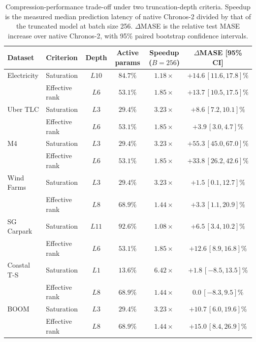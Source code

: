 \begin{table}[t]
    \centering
    \small
    \setlength{\tabcolsep}{4pt}
    \caption{
    Compression-performance trade-off under two truncation-depth criteria.
    Speedup is the measured median prediction latency of native Chronos-2
    divided by that of the truncated model at batch size 256.
    \(\Delta\)MASE is the relative test MASE increase over native Chronos-2,
    with 95\% paired bootstrap confidence intervals.
    }
    \label{tab:compression-selection}
    \begin{tabular}{llcccc}
        \toprule
        Dataset & Criterion & Depth & Active params & Speedup (\(B=256\)) &
        \(\Delta\)MASE [95\% CI] \\
        \midrule
        Electricity
        & Saturation & \(L10\) & \(84.7\%\) & \(1.18\times\) &
        \(+14.6\,[11.6,17.8]\%\) \\
        & Effective rank & \(L6\) & \(53.1\%\) & \(1.85\times\) &
        \(+13.7\,[10.5,17.5]\%\) \\
        \addlinespace

        Uber TLC
        & Saturation & \(L3\) & \(29.4\%\) & \(3.23\times\) &
        \(+8.6\,[7.2,10.1]\%\) \\
        & Effective rank & \(L6\) & \(53.1\%\) & \(1.85\times\) &
        \(+3.9\,[3.0,4.7]\%\) \\
        \addlinespace

        M4
        & Saturation & \(L3\) & \(29.4\%\) & \(3.23\times\) &
        \(+55.3\,[45.0,67.0]\%\) \\
        & Effective rank & \(L6\) & \(53.1\%\) & \(1.85\times\) &
        \(+33.8\,[26.2,42.6]\%\) \\
        \addlinespace

        Wind Farms
        & Saturation & \(L3\) & \(29.4\%\) & \(3.23\times\) &
        \(+1.5\,[0.1,12.7]\%\) \\
        & Effective rank & \(L8\) & \(68.9\%\) & \(1.44\times\) &
        \(+3.3\,[1.1,20.9]\%\) \\
        \midrule

        SG Carpark
        & Saturation & \(L11\) & \(92.6\%\) & \(1.08\times\) &
        \(+6.5\,[3.4,10.2]\%\) \\
        & Effective rank & \(L6\) & \(53.1\%\) & \(1.85\times\) &
        \(+12.6\,[8.9,16.8]\%\) \\
        \addlinespace

        Coastal T-S
        & Saturation & \(L1\) & \(13.6\%\) & \(6.42\times\) &
        \(+1.8\,[-8.5,13.5]\%\) \\
        & Effective rank & \(L8\) & \(68.9\%\) & \(1.44\times\) &
        \(0.0\,[-8.3,9.5]\%\) \\
        \addlinespace

        BOOM
        & Saturation & \(L3\) & \(29.4\%\) & \(3.23\times\) &
        \(+10.7\,[6.0,19.6]\%\) \\
        & Effective rank & \(L8\) & \(68.9\%\) & \(1.44\times\) &
        \(+15.0\,[8.4,26.9]\%\) \\
        \bottomrule
    \end{tabular}
\end{table}



